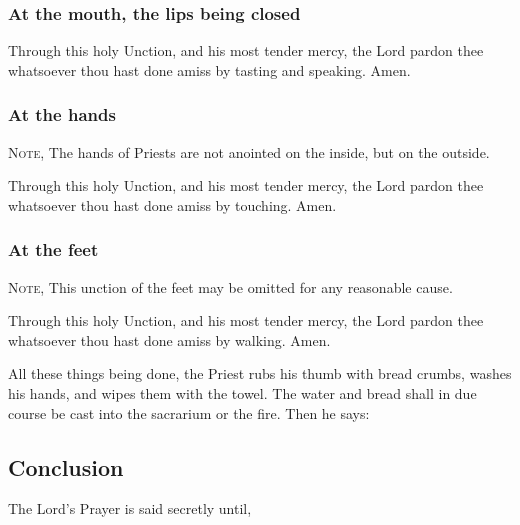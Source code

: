 \subsubsection{At the mouth, the lips being closed}\noindent
Through this holy {} Unction, and his most tender mercy, the Lord pardon thee whatsoever thou hast done amiss by tasting and speaking. Amen.
\subsubsection{At the hands}
\begin{rubric}
    \textsc{Note,} The hands of Priests are not anointed on the inside, but on the outside.
\end{rubric}\par\noindent
Through this holy {} Unction, and his most tender mercy, the Lord pardon thee whatsoever thou hast done amiss by touching. Amen.
\subsubsection{At the feet}
\begin{rubric}
    \textsc{Note,} This unction of the feet may be omitted for any reasonable cause.
\end{rubric}\par\noindent
Through this holy {} Unction, and his most tender mercy, the Lord pardon thee whatsoever thou hast done amiss by walking. Amen.
\begin{rubric}
    All these things being done, the Priest rubs his thumb with bread crumbs, washes his hands, and wipes them with the towel. The water and bread shall in due course be cast into the sacrarium or the fire. Then he says:
\end{rubric}
\subsection{Conclusion}
\begin{rubric}
    The Lord's Prayer is said secretly until,
\end{rubric}\par
{}


